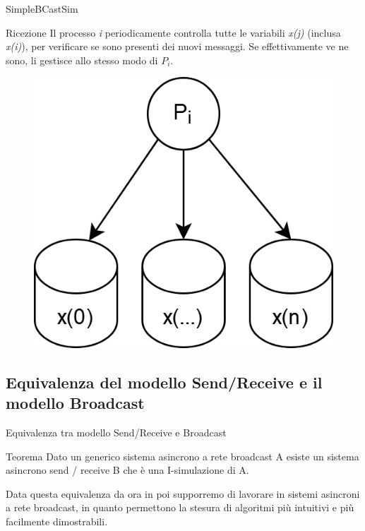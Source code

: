 \documentclass{beamer}
\begin{document}
\begin{frame}{SimpleBCastSim}
    \begin{block}{Ricezione}
        Il processo \textit{i} periodicamente controlla tutte le variabili \textit{x(j)} (inclusa \textit{x(i)}), per verificare se sono presenti dei nuovi messaggi. Se effettivamente ve ne sono, li gestisce allo stesso modo di $P_{i}$.
        \begin{figure}
            \centering
            \includegraphics[scale=0.26]{BroadcastReceive.png}
        \end{figure}
    \end{block}
\end{frame}


\subsection{Equivalenza del modello Send/Receive e il modello Broadcast}

\begin{frame}{Equivalenza tra modello Send/Receive e Broadcast}
    \begin{block}{Teorema}
        Dato un generico sistema asincrono a rete broadcast A esiste un sistema asincrono send / receive B che è una I-simulazione di A.
    \end{block}

    \vspace{0.5cm}

    Data questa equivalenza da ora in poi supporremo di lavorare in sistemi asincroni a rete broadcast, in quanto permettono la stesura di algoritmi più intuitivi e più facilmente dimostrabili.
\end{frame}
\end{document}
